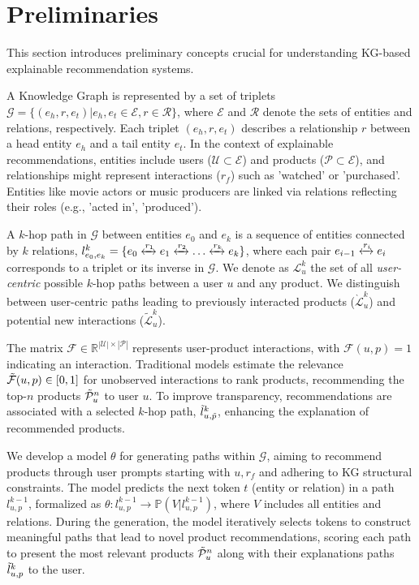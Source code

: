 \documentclass[sigconf]{acmart}
\begin{document}
\section{Preliminaries}
This section introduces preliminary concepts crucial for understanding KG-based explainable recommendation systems.

 A Knowledge Graph is represented by a set of triplets \(\mathcal{G} = \{(e_h, r, e_t) | e_h, e_t \in \mathcal{E}, r \in \mathcal{R}\}\), where \(\mathcal{E}\) and \(\mathcal{R}\) denote the sets of entities and relations, respectively. Each triplet \((e_h, r, e_t)\) describes a relationship \(r\) between a head entity \(e_h\) and a tail entity \(e_t\). In the context of explainable recommendations, entities include users (\(\mathcal{U} \subset \mathcal{E}\)) and products (\(\mathcal{P} \subset \mathcal{E}\)), and relationships might represent interactions (\(r_f\)) such as 'watched' or 'purchased'. Entities like movie actors or music producers are linked via relations reflecting their roles (e.g., 'acted in', 'produced').

 A \(k\)-hop path in \(\mathcal{G}\) between entities \(e_0\) and \(e_k\) is a sequence of entities connected by \(k\) relations, \(l^k_{e_0, e_k} = \{ e_0 \xleftrightarrow[]{r_1} e_1 \xleftrightarrow[]{r_2} \dots \xleftrightarrow[]{r_k} e_k \}\), where each pair \(e_{i-1} \xleftrightarrow[]{r_i} e_i\) corresponds to a triplet or its inverse in \(\mathcal{G}\). We denote as $\mathcal L^k_{u}$ the set of all \emph{user-centric} possible $k$-hop paths between a user $u$ and any product. We distinguish between user-centric paths leading to previously interacted products (\(\mathcal{\grave{L}}^k_{u}\)) and potential new interactions (\(\mathcal{\tilde{L}}^k_{u}\)).

 The matrix \(\mathcal F \in \mathbb R^{|\mathcal U| \times |\mathcal P|}\) represents user-product interactions, with \(\mathcal F(u, p) = 1\) indicating an interaction. Traditional models estimate the relevance \(\Tilde{\mathcal F}(u, p) \in [0, 1]\) for unobserved interactions to rank products, recommending the top-\(n\) products \(\Tilde{\mathcal P}^n_u\) to user \(u\). To improve transparency, recommendations are associated with a selected \(k\)-hop path, \(\Tilde{l}^k_{u,\tilde{p}}\), enhancing the explanation of recommended products.

 We develop a model \(\theta\) for generating paths within \(\mathcal{G}\), aiming to recommend products through user prompts starting with \(u, r_f\) and adhering to KG structural constraints. The model predicts the next token \(t\) (entity or relation) in a path \(l^{k-1}_{u,p}\), formalized as \(\theta : l^{k-1}_{u,p} \rightarrow \mathbb{P}(V | l^{k-1}_{u,p})\), where \(V\) includes all entities and relations. During the generation, the model iteratively selects tokens to construct meaningful paths that lead to novel product recommendations, scoring each path to present the most relevant products $\Tilde{\mathcal P}^n_u$ along with their explanations paths $\Tilde{l}^k_{u,p}$ to the user.
\end{document}

